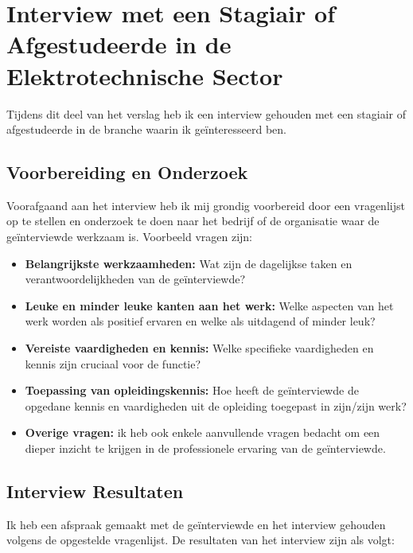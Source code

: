 \section{Interview met een Stagiair of Afgestudeerde in de Elektrotechnische Sector}
Tijdens dit deel van het verslag heb ik een interview gehouden met een stagiair of afgestudeerde in de branche waarin ik geïnteresseerd ben.

\subsection{Voorbereiding en Onderzoek}

Voorafgaand aan het interview heb ik mij grondig voorbereid door een vragenlijst op te stellen en onderzoek te doen naar het bedrijf of de organisatie waar de geïnterviewde werkzaam is. Voorbeeld vragen zijn:

\begin{itemize}
    \item \textbf{Belangrijkste werkzaamheden:} Wat zijn de dagelijkse taken en verantwoordelijkheden van de geïnterviewde?
    \item \textbf{Leuke en minder leuke kanten aan het werk:} Welke aspecten van het werk worden als positief ervaren en welke als uitdagend of minder leuk?
    \item \textbf{Vereiste vaardigheden en kennis:} Welke specifieke vaardigheden en kennis zijn cruciaal voor de functie?
    \item \textbf{Toepassing van opleidingskennis:} Hoe heeft de geïnterviewde de opgedane kennis en vaardigheden uit de opleiding toegepast in zijn/zijn werk?
    \item \textbf{Overige vragen:} ik heb ook enkele aanvullende vragen bedacht om een dieper inzicht te krijgen in de professionele ervaring van de geïnterviewde.
\end{itemize}

\subsection{Interview Resultaten}

Ik heb een afspraak gemaakt met de geïnterviewde en het interview gehouden volgens de opgestelde vragenlijst. De resultaten van het interview zijn als volgt:



